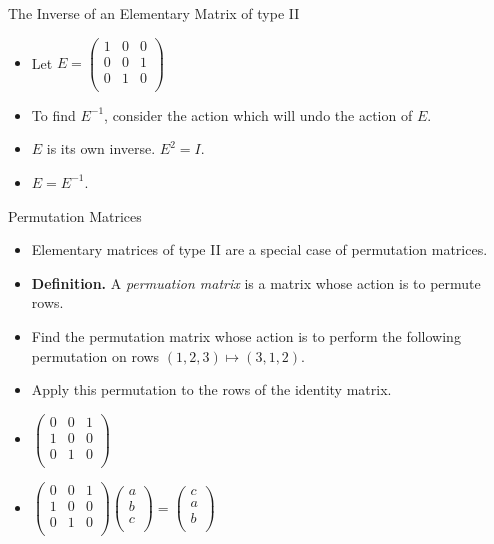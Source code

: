 \documentclass{beamer}
\begin{document}
\begin{frame}{The Inverse of an Elementary Matrix of type II}

\begin{itemize}
\item Let $E=
\begin{pmatrix}
1 & 0 & 0 \\
0 & 0 & 1 \\
0 & 1 & 0 \\
\end{pmatrix}
$
\item To find $E^{-1}$, consider the action which will undo the action
of $E$.
\item $E$ is its own inverse. $E^2=I$.
\item $E=E^{-1}$.
\end{itemize}
\end{frame}

\begin{frame}{Permutation Matrices}

\begin{itemize}
\item Elementary matrices of type II are a special case of permutation matrices.
\item \textbf{Definition.} A \emph{permuation matrix} is a matrix whose action
is to permute rows.
\item Find the permutation matrix whose action is to perform the following
permutation on rows $(1,2,3) \mapsto (3,1,2)$.
\item Apply this permutation to the rows of the identity matrix.
\item $
\begin{pmatrix}
0 & 0 & 1 \\
1 & 0 & 0 \\
0 & 1 & 0 \\
\end{pmatrix}
$
\item
$
\begin{pmatrix}
0 & 0 & 1 \\
1 & 0 & 0 \\
0 & 1 & 0 \\
\end{pmatrix}
\begin{pmatrix}
 a \\
 b \\
 c \\
\end{pmatrix}
=
\begin{pmatrix}
 c \\
 a \\
 b \\
\end{pmatrix}
$
\end{itemize}
\end{frame}
\end{document}
